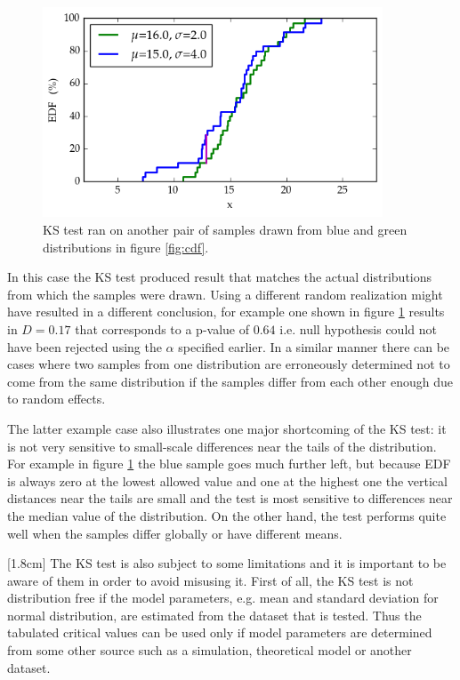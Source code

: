 \documentclass[english, oneside]{HYgradu}
\begin{document}
\begin{figure}
   \centering
   \includegraphics[width=0.9\textwidth]{kuvat/kstest-error.png}
   \caption{KS test ran on another pair of samples drawn from blue and green distributions in figure \ref{fig:cdf}.}
   \label{fig:ks-error} 
\end{figure}

In this case the KS test produced result that matches the actual distributions from which the samples were drawn. Using a different random realization might have resulted in a different conclusion, for example one shown in figure \ref{fig:ks-error} results in $D=0.17$ that corresponds to a p-value of $0.64$ i.e. null hypothesis could not have been rejected using the $\alpha$ specified earlier. In a similar manner there can be cases where two samples from one distribution are erroneously determined not to come from the same distribution if the samples differ from each other enough due to random effects.

The latter example case also illustrates one major shortcoming of the KS test: it is not very sensitive to small-scale differences near the tails of the distribution. For example in figure \ref{fig:ks-error} the blue sample goes much further left, but because EDF is always zero at the lowest allowed value and one at the highest one the vertical distances near the tails are small and the test is most sensitive to differences near the median value of the distribution. On the other hand, the test performs quite well when the samples differ globally or have different means. \citep{feigelson2012modern}

\reversemarginpar
{}[1.8cm]
The KS test is also subject to some limitations and it is important to be aware of them in order to avoid misusing it. First of all, the KS test is not distribution free if the model parameters, e.g. mean and standard deviation for normal distribution, are estimated from the dataset that is tested. Thus the tabulated critical values can be used only if model parameters are determined from some other source such as a simulation, theoretical model or another dataset. \citep{feigelson2012modern}
\end{document}
